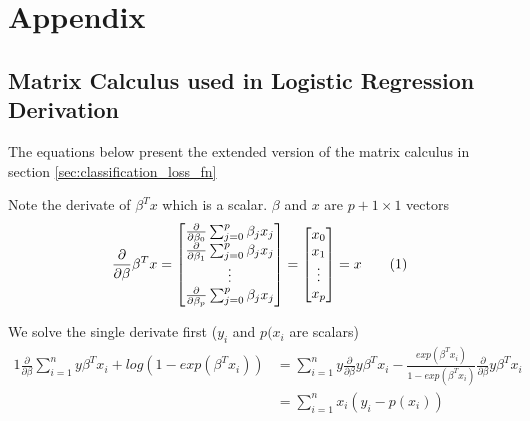 \documentclass[../statistical_learning_notes.tex]{subfiles}
\begin{document}
\chapter{Appendix}
\section{Matrix Calculus used in Logistic Regression Derivation}\label{sec:appendix_classification_loss_fn}
The equations below present the extended version of the matrix calculus in section \ref{sec:classification_loss_fn}\newline

Note the derivate of $\beta^{T}x$ which is a scalar. $\beta$ and $x$ are $p+1 \times 1$ vectors
\begin{gather*}
    \frac{\partial}{\partial \beta}\beta^{T}x =     
    \begin{bmatrix}
        \frac{\partial}{\partial \beta_{0}} \sum_{j=0}^{p} \beta_{j}x_{j}\\
        \frac{\partial}{\partial \beta_{1}} \sum_{j=0}^{p} \beta_{j}x_{j}\\
        \vdots\\
        \frac{\partial}{\partial \beta_{p}} \sum_{j=0}^{p} \beta_{j}x_{j}
    \end{bmatrix}
    = 
    \begin{bmatrix}
        x_{0}\\
        x_{1}\\
        \vdots\\
        x_{p}
    \end{bmatrix}
    = x \numberthiseqn\label{eq:betax_derivative}
\end{gather*}

We solve the single derivate first ($y_{i}$ and $p(x_{i}$ are scalars)
\begin{alignat*}{1}
    \frac{\partial}{\partial \beta}\sum_{i=1}^{n} y\beta^{T}x_{i} + log(1 - exp(\beta^{T}x_{i})) &= \sum_{i=1}^{n} y \frac{\partial}{\partial \beta} y\beta^{T}x_{i} - \frac{exp(\beta^{T}x_{i})}{1 - exp(\beta^{T}x_{i})} \frac{\partial}{\partial \beta} y\beta^{T}x_{i}\\
    &= \sum_{i=1}^{n} x_{i}(y_{i} - p(x_{i}))
\end{alignat*}
\end{document}
